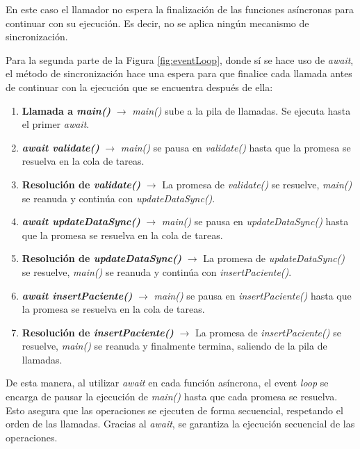 En este caso el llamador no espera la finalización de las funciones asíncronas para continuar con su ejecución. Es decir, no se aplica ningún mecanismo de sincronización.

Para la segunda parte de la Figura \ref{fig:eventLoop}, donde sí se hace uso de \textit{await}, el método de sincronización hace una espera para que finalice cada llamada antes de continuar con la ejecución que se encuentra después de ella:

\begin{enumerate}
    \item \textbf{Llamada a \textit{main()}} $\rightarrow$ \textit{main()} sube a la pila de llamadas. Se ejecuta hasta el primer \textit{await}.
    
    \item \textbf{\textit{await validate()}} $\rightarrow$ \textit{main()} se pausa en \textit{validate()} hasta que la promesa se resuelva en la cola de tareas.
    
    \item \textbf{Resolución de \textit{validate()}} $\rightarrow$ La promesa de \textit{validate()} se resuelve, \textit{main()} se reanuda y continúa con \textit{updateDataSync()}.
    
    \item \textbf{\textit{await updateDataSync()}} $\rightarrow$ \textit{main()} se pausa en \textit{updateDataSync()} hasta que la promesa se resuelva en la cola de tareas.
    
    \item \textbf{Resolución de \textit{updateDataSync()}} $\rightarrow$ La promesa de \textit{updateDataSync()} se resuelve, \textit{main()} se reanuda y continúa con \textit{insertPaciente()}.
    
    \item \textbf{\textit{await insertPaciente()}} $\rightarrow$ \textit{main()} se pausa en \textit{insertPaciente()} hasta que la promesa se resuelva en la cola de tareas.
    
    \item \textbf{Resolución de \textit{insertPaciente()}} $\rightarrow$ La promesa de \textit{insertPaciente()} se resuelve, \textit{main()} se reanuda y finalmente termina, saliendo de la pila de llamadas.
\end{enumerate}

De esta manera, al utilizar \textit{await} en cada función asíncrona, el event \textit{loop} se encarga de pausar la ejecución de \textit{main()} hasta que cada promesa se resuelva. Esto asegura que las operaciones se ejecuten de forma secuencial, respetando el orden de las llamadas. Gracias al \textit{await}, se garantiza la ejecución secuencial de las operaciones.

